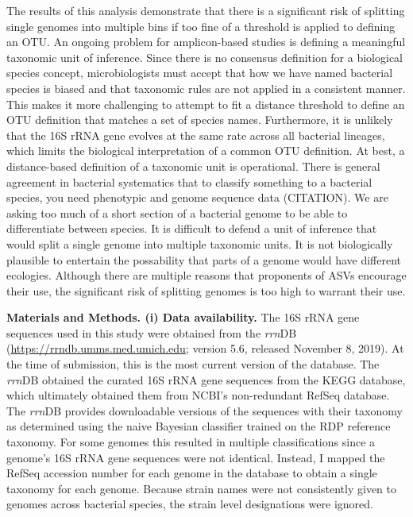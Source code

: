 \documentclass[
]{article}
\begin{document}
The results of this analysis demonstrate that there is a significant
risk of splitting single genomes into multiple bins if too fine of a
threshold is applied to defining an OTU. An ongoing problem for
amplicon-based studies is defining a meaningful taxonomic unit of
inference. Since there is no consensus definition for a biological
species concept, microbiologists must accept that how we have named
bacterial species is biased and that taxonomic rules are not applied in
a consistent manner. This makes it more challenging to attempt to fit a
distance threshold to define an OTU definition that matches a set of
species names. Furthermore, it is unlikely that the 16S rRNA gene
evolves at the same rate across all bacterial lineages, which limits the
biological interpretation of a common OTU definition. At best, a
distance-based definition of a taxonomic unit is operational. There is
general agreement in bacterial systematics that to classify something to
a bacterial species, you need phenotypic and genome sequence data
(CITATION). We are asking too much of a short section of a bacterial
genome to be able to differentiate between species. It is difficult to
defend a unit of inference that would split a single genome into
multiple taxonomic units. It is not biologically plausible to entertain
the possability that parts of a genome would have different ecologies.
Although there are multiple reasons that proponents of ASVs encourage
their use, the significant risk of splitting genomes is too high to
warrant their use.

\textbf{Materials and Methods. (i) Data availability.} The 16S rRNA gene
sequences used in this study were obtained from the \emph{rrn}DB
(\url{https://rrndb.umms.med.umich.edu}; version 5.6, released November
8, 2019). At the time of submission, this is the most current version of
the database. The \emph{rrn}DB obtained the curated 16S rRNA gene
sequences from the KEGG database, which ultimately obtained them from
NCBI's non-redundant RefSeq database. The \emph{rrn}DB provides
downloadable versions of the sequences with their taxonomy as determined
using the naive Bayesian classifier trained on the RDP reference
taxonomy. For some genomes this resulted in multiple classifications
since a genome's 16S rRNA gene sequences were not identical. Instead, I
mapped the RefSeq accession number for each genome in the database to
obtain a single taxonomy for each genome. Because strain names were not
consistently given to genomes across bacterial species, the strain level
designations were ignored.
\end{document}
